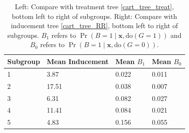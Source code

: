 \documentclass[aoas,preprint, 11pt, dvipsnames, table, x11name]{imsart}
\renewcommand{\bm}[1]{\mathbf{#1}}
\theoremstyle{remark}
\begin{document}
\begin{table}[h]
\begin{subtable}{.6\textwidth}

	\begin{tabular}{llP{1.4cm}P{1.4cm}}
	
		\toprule
		Subgroup&Mean Inducement&Mean $B_1$&Mean $B_0$\\  & 3.87 & 0.022 & 0.011 \\ 
	2 & 17.51 & 0.038 & 0.007 \\ 
	3 & 6.31 & 0.082 & 0.027 \\ 
	4 & 11.41 & 0.084 & 0.021 \\ 
	5 & 4.83 & 0.156 & 0.055 \\ 
		\bottomrule
	\end{tabular}
\end{subtable}%
\begin{subtable}{.6\textwidth}
\end{subtable}
		\caption{Left: Compare with treatment tree \ref{cart_tree_treat}, bottom left to right of subgroups. Right: Compare with inducement tree \ref{cart_tree_RR}, bottom left to right of subgroups. $B_1$ refers to $\Pr(B =1\mid \bm{x}, \text{do}(G=1))$ and $B_0$ refers to $\Pr(B=1\mid \bm{x}, \text{do}(G=0))$. }
		\label{tree_sub_table}

\end{table}
\end{document}
